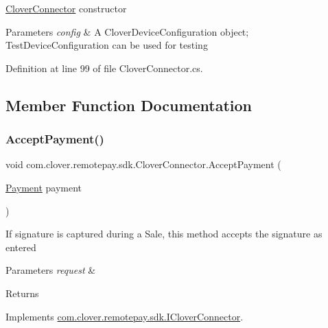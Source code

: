 \hyperlink{classcom_1_1clover_1_1remotepay_1_1sdk_1_1_clover_connector}{Clover\+Connector} constructor 


\begin{DoxyParams}{Parameters}
{\em config} & A Clover\+Device\+Configuration object; Test\+Device\+Configuration can be used for testing \\
\hline
\end{DoxyParams}


Definition at line 99 of file Clover\+Connector.\+cs.



\subsection{Member Function Documentation}
\mbox{\label{classcom_1_1clover_1_1remotepay_1_1sdk_1_1_clover_connector_afe33a1ba414608b2b05a3336128c7b5c}} 
\subsubsection{\texorpdfstring{Accept\+Payment()}{AcceptPayment()}}
{\footnotesize\ttfamily void com.\+clover.\+remotepay.\+sdk.\+Clover\+Connector.\+Accept\+Payment (\begin{DoxyParamCaption}\item[{\hyperlink{classcom_1_1clover_1_1sdk_1_1v3_1_1payments_1_1_payment}{Payment}}]{payment }\end{DoxyParamCaption})}



If signature is captured during a Sale, this method accepts the signature as entered 


\begin{DoxyParams}{Parameters}
{\em request} & \\
\hline
\end{DoxyParams}
\begin{DoxyReturn}{Returns}

\end{DoxyReturn}


Implements \hyperlink{interfacecom_1_1clover_1_1remotepay_1_1sdk_1_1_i_clover_connector_ad6286e6d5ec3157f3ceeafc1de504dff}{com.\+clover.\+remotepay.\+sdk.\+I\+Clover\+Connector}.



